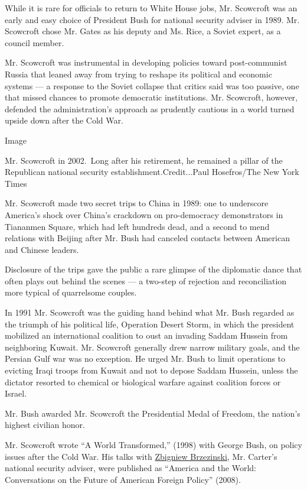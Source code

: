 While it is rare for officials to return to White House jobs, Mr.
Scowcroft was an early and easy choice of President Bush for national
security adviser in 1989. Mr. Scowcroft chose Mr. Gates as his deputy
and Ms. Rice, a Soviet expert, as a council member.

Mr. Scowcroft was instrumental in developing policies toward
post-communist Russia that leaned away from trying to reshape its
political and economic systems --- a response to the Soviet collapse
that critics said was too passive, one that missed chances to promote
democratic institutions. Mr. Scowcroft, however, defended the
administration's approach as prudently cautious in a world turned upside
down after the Cold War.

Image

Mr. Scowcroft in 2002.~Long after his retirement, he remained a pillar
of the Republican national security establishment.Credit...Paul
Hosefros/The New York Times

Mr. Scowcroft made two secret trips to China in 1989: one to underscore
America's shock over China's crackdown on pro-democracy demonstrators in
Tiananmen Square, which had left hundreds dead, and a second to mend
relations with Beijing after Mr. Bush had canceled contacts between
American and Chinese leaders.

Disclosure of the trips gave the public a rare glimpse of the diplomatic
dance that often plays out behind the scenes --- a two-step of rejection
and reconciliation more typical of quarrelsome couples.

In 1991 Mr. Scowcroft was the guiding hand behind what Mr. Bush regarded
as the triumph of his political life, Operation Desert Storm, in which
the president mobilized an international coalition to oust an invading
Saddam Hussein from neighboring Kuwait. Mr. Scowcroft generally drew
narrow military goals, and the Persian Gulf war was no exception. He
urged Mr. Bush to limit operations to evicting Iraqi troops from Kuwait
and not to depose Saddam Hussein, unless the dictator resorted to
chemical or biological warfare against coalition forces or Israel.

Mr. Bush awarded Mr. Scowcroft the Presidential Medal of Freedom, the
nation's highest civilian honor.

Mr. Scowcroft wrote ``A World Transformed,'' (1998) with George Bush, on
policy issues after the Cold War. His talks with
\href{https://www.nytimes.com/2017/05/26/us/zbigniew-brzezinski-dead-national-security-adviser-to-carter.html}{Zbigniew
Brzezinski}, Mr. Carter's national security adviser, were published as
``America and the World: Conversations on the Future of American Foreign
Policy'' (2008).

